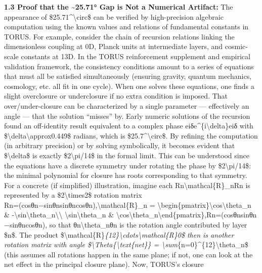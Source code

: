 \documentclass[]{article}
\begin{document}
\textbf{1.3 Proof that the \textasciitilde{}25.71° Gap is Not a
Numerical Artifact:} The appearance of \$25.71\^{}\textbackslash{}circ\$
can be verified by high-precision algebraic computation using the known
values and relations of fundamental constants in TORUS. For example,
consider the chain of recursion relations linking the dimensionless
coupling at 0D, Planck units at intermediate layers, and cosmic-scale
constants at 13D. In the TORUS reinforcement supplement and empirical
validation framework, the consistency conditions amount to a series of
equations that must all be satisfied simultaneously (ensuring gravity,
quantum mechanics, cosmology, etc. all fit in one cycle)​. When one
solves these equations, one finds a slight overclosure or underclosure
if no extra condition is imposed. That over/under-closure can be
characterized by a single parameter --- effectively an angle --- that
the solution ``misses'' by. Early numeric solutions of the recursion
found an off-identity result equivalent to a complex phase
eiδe\^{}\{i\textbackslash{}delta\}eiδ with
\$\textbackslash{}delta\textbackslash{}approx0.449\$ radians, which is
\$25.7\^{}\textbackslash{}circ\$. By refining the computation (in
arbitrary precision) or by solving symbolically, it becomes evident that
\$\textbackslash{}delta\$ is exactly \$2\textbackslash{}pi/14\$ in the
formal limit. This can be understood since the equations have a discrete
symmetry under rotating the phase by \$2\textbackslash{}pi/14\$: the
minimal polynomial for closure has roots corresponding to that symmetry.
For a concrete (if simplified) illustration, imagine each
Rn\textbackslash{}mathcal\{R\}\_nRn​ is represented by a
\$2\textbackslash{}times2\$ rotation matrix\\
Rn=(cos⁡θn−sin⁡θnsin⁡θncos⁡θn),\textbackslash{}mathcal\{R\}\_n =
\textbackslash{}begin\{pmatrix\}\textbackslash{}cos\textbackslash{}theta\_n
\&
-\textbackslash{}sin\textbackslash{}theta\_n\textbackslash{}\textbackslash{}
\textbackslash{}sin\textbackslash{}theta\_n \&
\textbackslash{}cos\textbackslash{}theta\_n\textbackslash{}end\{pmatrix\},Rn​=(cosθn​sinθn​​−sinθn​cosθn​​),
so that θn\textbackslash{}theta\_nθn​ is the rotation angle contributed
by layer \$n\$. The product
\$\textbackslash{}mathcal\{R\}\emph{\{12\}\textbackslash{}cdots\textbackslash{}mathcal\{R\}0\$
then is another rotation matrix with angle
\$\textbackslash{}Theta\{\textbackslash{}text\{net\}\} =
\textbackslash{}sum}\{n=0\}\^{}\{12\}\textbackslash{}theta\_n\$ (this
assumes all rotations happen in the same plane; if not, one can look at
the net effect in the principal closure plane). Now, TORUS's closure
\end{document}
